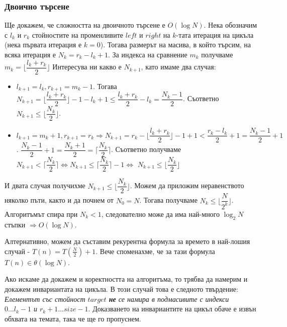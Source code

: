 \documentclass[fleqn,12pt]{article}
\begin{document}
\subsubsection{Двоично търсене}
Ще докажем, че сложността на двоичното търсене е $O(\log N)$.
Нека обозначим с $l_k$ и $r_k$ стойностите на променливите $left$ и $right$ на $k$-тата итерация на цикъла (нека първата итерация е $k = 0$).
Тогава размерът на масива, в който търсим, на всяка итерация е $N_k = r_k - l_k + 1$. За индекса на сравнение $m_k$ получваме
$m_k = \Big\lfloor\dfrac{l_k + r_k}{2}\Big\rfloor$ Интересува ни какво е $N_{k + 1}$, като имаме два случая:
\begin{itemize}
    \item $l_{k+1} = l_k, r_{k+1} = m_k - 1$. Тогава $N_{k+1} = \Big\lfloor\dfrac{l_k + r_k}{2}\Big\rfloor - 1 - l_k + 1 \leq \dfrac{l_k + r_k}{2} - l_k = \dfrac{N_k - 1}{2}$.
    Съответно $N_{k+1} \leq \Bigg\lfloor \dfrac{N_k}{2} \Bigg\rfloor$.
    \item $l_{k+1} = m_k + 1, r_{k+1} = r_k \Rightarrow N_{k+1} = r_k - \Big\lfloor\dfrac{l_k + r_k}{2}\Big\rfloor - 1 + 1 < \dfrac{r_k - l_k}{2} + 1 = \dfrac{N_k - 1}{2} + 1$. 
    $\dfrac{N_k - 1}{2} + 1 = \dfrac{N_k + 1}{2} = \Bigg\lceil \dfrac{N_k}{2} \Bigg\rceil$.
    Съответно получваме $N_{k+1} < \Bigg\lceil \dfrac{N_k}{2} \Bigg\rceil \Leftrightarrow N_{k+1} \leq \Bigg\lceil \dfrac{N_k}{2} \Bigg\rceil - 1 \Leftrightarrow $
    $N_{k+1} \leq \Bigg\lfloor \dfrac{N_k}{2} \Bigg\rfloor$
\end{itemize}

И двата случая получихме $N_{k+1} \leq \Bigg\lfloor \dfrac{N_k}{2} \Bigg\rfloor$.
Можем да приложим неравенството няколко пъти, както и да почнем от $N_0 = N$. 
Тогава получваме $N_k \leq \Bigg\lfloor \dfrac{N}{2^k} \Bigg\rfloor$. Алгоритъмът спира при $N_k < 1$,
следователно може да има най-много $\log_2 N$ стъпки $\Rightarrow O(\log N)$.

Алтернативно, можем да съставим рекурентна формула за времето в най-лошия случай - $T(n) = T\left(\frac{N}{2}\right) + 1$.
Вече споменахме, че за тази формула $T(n) \in \theta(\log N)$. 

Ако искаме да докажем и коректността на алгоритъма, то трябва да намерим и докажем инвариантата на цикъла.
В този случай това е следното твърдение: \textit{Елементът със стойност $target$ \textbf{не} се намира в подмасивите с индекси $0 \dots l_k - 1$ и $r_k + 1 \dots size - 1$}.
Доказването на инвариантите на цикъл обаче е извън обхвата на темата, така че ще го пропуснем.
\end{document}
